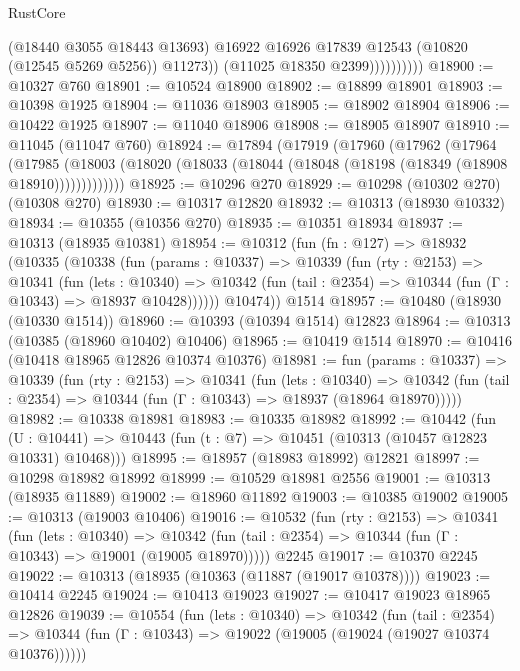 \begin{lexlean}{RustCore}
\begin{coremodule}
                          (@18440 @3055 @18443 @13693)
                          @16922
                          @16926
                          @17839
                          @12543
                          (@10820 (@12545 @5269 @5256))
                          @11273))
                      (@11025 @18350 @2399))))))))))
@18900 := @10327 @760
@18901 := @10524 @18900
@18902 := @18899 @18901
@18903 := @10398 @1925
@18904 := @11036 @18903
@18905 := @18902 @18904
@18906 := @10422 @1925
@18907 := @11040 @18906
@18908 := @18905 @18907
@18910 := @11045 (@11047 @760)
@18924 := @17894
    (@17919
      (@17960
        (@17962
          (@17964
            (@17985
              (@18003 (@18020 (@18033 (@18044 (@18048 (@18198 (@18349 (@18908 @18910)))))))))))))
@18925 := @10296 @270
@18929 := @10298 (@10302 @270) (@10308 @270)
@18930 := @10317 @12820
@18932 := @10313 (@18930 @10332)
@18934 := @10355 (@10356 @270)
@18935 := @10351 @18934
@18937 := @10313 (@18935 @10381)
@18954 := @10312
    (fun (fn : @127) =>
    @18932
      (@10335
        (@10338
          (fun (params : @10337) =>
          @10339
            (fun (rty : @2153) =>
            @10341
              (fun (lets : @10340) =>
              @10342 (fun (tail : @2354) => @10344 (fun (Γ : @10343) => @18937 @10428))))))
        @10474))
    @1514
@18957 := @10480 (@18930 (@10330 @1514))
@18960 := @10393 (@10394 @1514) @12823
@18964 := @10313 (@10385 (@18960 @10402) @10406)
@18965 := @10419 @1514
@18970 := @10416 (@10418 @18965 @12826 @10374 @10376)
@18981 := fun (params : @10337) =>
  @10339
    (fun (rty : @2153) =>
    @10341
      (fun (lets : @10340) =>
      @10342 (fun (tail : @2354) => @10344 (fun (Γ : @10343) => @18937 (@18964 @18970)))))
@18982 := @10338 @18981
@18983 := @10335 @18982
@18992 := @10442
    (fun (U : @10441) => @10443 (fun (t : @7) => @10451 (@10313 (@10457 @12823 @10331) @10468)))
@18995 := @18957 (@18983 @18992) @12821
@18997 := @10298 @18982 @18992
@18999 := @10529 @18981 @2556
@19001 := @10313 (@18935 @11889)
@19002 := @18960 @11892
@19003 := @10385 @19002
@19005 := @10313 (@19003 @10406)
@19016 := @10532
    (fun (rty : @2153) =>
    @10341
      (fun (lets : @10340) =>
      @10342 (fun (tail : @2354) => @10344 (fun (Γ : @10343) => @19001 (@19005 @18970)))))
    @2245
@19017 := @10370 @2245
@19022 := @10313 (@18935 (@10363 (@11887 (@19017 @10378))))
@19023 := @10414 @2245
@19024 := @10413 @19023
@19027 := @10417 @19023 @18965 @12826
@19039 := @10554
    (fun (lets : @10340) =>
    @10342
      (fun (tail : @2354) =>
      @10344 (fun (Γ : @10343) => @19022 (@19005 (@19024 (@19027 @10374 @10376))))))

\end{coremodule}
\end{lexlean}
